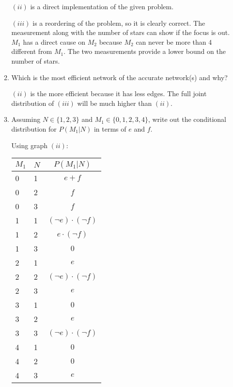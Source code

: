 \documentclass[12pt,letterpaper]{article}
\begin{document}
\begin{enumerate}
\begin{enumerate}
        $(ii)$ is a direct implementation of the given problem.

        $(iii)$ is a reordering of the problem, so it is clearly correct.
        The measurement along with the number of stars can show if the focus is out.
        $M_1$ has a direct cause on $M_2$ because $M_2$ can never be more than 4 different from $M_1$.
        The two measurements provide a lower bound on the number of stars.

        \item Which is the most efficient network of the accurate network(s) and why?

        $(ii)$ is the more efficient because it has less edges.
        The full joint distribution of $(iii)$ will be much higher than $(ii)$.

        \item Assuming $N \in \{1,2,3\}$ and $M_1 \in \{0,1,2,3,4\}$,
        write out the conditional distribution for $P(M_1|N)$ in terms of $e$ and $f$.

        Using graph $(ii)$:

        \begin{tabular}{l l | c}
          $M_1$ & $N$ & $P(M_1|N)$ \\
          \hline
          0 & 1 & $e + f$ \\
          0 & 2 & $f$ \\
          0 & 3 & $f$ \\
          1 & 1 & $(\neg e) \cdot (\neg f)$ \\
          1 & 2 & $e \cdot (\neg f)$ \\
          1 & 3 & $0$ \\
          2 & 1 & $e$ \\
          2 & 2 & $(\neg e) \cdot (\neg f)$ \\
          2 & 3 & $e$ \\
          3 & 1 & $0$ \\
          3 & 2 & $e$ \\
          3 & 3 & $(\neg e) \cdot (\neg f)$ \\
          4 & 1 & $0$ \\
          4 & 2 & $0$ \\
          4 & 3 & $e$ \\
        \end{tabular}
      \end{enumerate}
  \end{enumerate}
\end{document}
